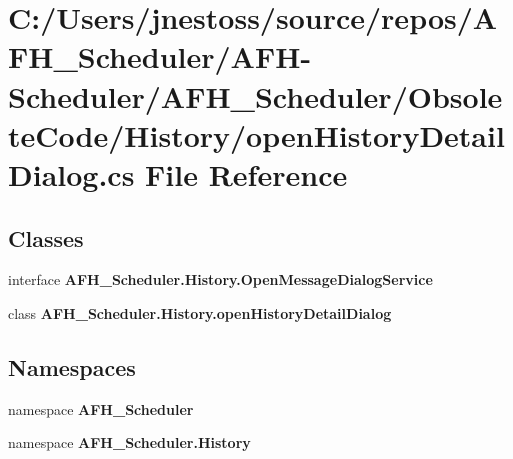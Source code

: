 \section{C\+:/\+Users/jnestoss/source/repos/\+A\+F\+H\+\_\+\+Scheduler/\+A\+F\+H-\/\+Scheduler/\+A\+F\+H\+\_\+\+Scheduler/\+Obsolete\+Code/\+History/open\+History\+Detail\+Dialog.cs File Reference}
\label{open_history_detail_dialog_8cs}
\subsection*{Classes}
\begin{DoxyCompactItemize}
\item 
interface \textbf{ A\+F\+H\+\_\+\+Scheduler.\+History.\+Open\+Message\+Dialog\+Service}
\item 
class \textbf{ A\+F\+H\+\_\+\+Scheduler.\+History.\+open\+History\+Detail\+Dialog}
\end{DoxyCompactItemize}
\subsection*{Namespaces}
\begin{DoxyCompactItemize}
\item 
namespace \textbf{ A\+F\+H\+\_\+\+Scheduler}
\item 
namespace \textbf{ A\+F\+H\+\_\+\+Scheduler.\+History}
\end{DoxyCompactItemize}
